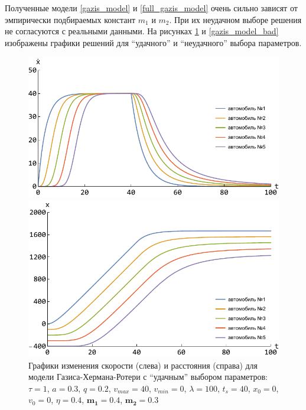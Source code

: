 \documentclass[12pt, a4paper]{extarticle}
\numberwithin{equation}{section}
\numberwithin{figure}{section}
\begin{document}
Полученные модели \eqref{gazis_model} и \eqref{full_gazis_model} очень сильно зависят от эмпирически подбираемых констант $m_1$ и $m_2$. При их неудачном выборе решения не согласуются с реальными данными. На рисунках \ref{gazis_model_good} и \ref{gazis_model_bad} изображены графики решений для ``удачного'' и ``неудачного'' выбора параметров. 
\begin{figure}[h!]
	\begin{center}
		\begin{minipage}[h!]{0.48\linewidth}
			\includegraphics[width=1\linewidth,height=0.2\textheight]
			{Images/gazis_model_good_speed.pdf}
		\end{minipage}
		\hfill 
		\begin{minipage}[h!]{0.48\linewidth}
			\includegraphics[width=1\linewidth,height=0.2\textheight]
			{Images/gazis_model_good_distance.pdf}
		\end{minipage}
		\caption{Графики изменения скорости (слева) и расстояния (справа) для модели Газиса-Хермана-Ротери с ``удачным'' выбором параметров: $\tau=1$, $a=0.3$, $q=0.2$, $v_{max}=40$, $v_{min}=0$, $\lambda=100$, $t_s=40$, $x_0=0$, $v_0=0$, $\eta=0.4$, $\boldsymbol{m_1=0.4}$, $\boldsymbol{m_2=0.3}$}
		\label{gazis_model_good}
	\end{center}
\end{figure}
\end{document}
